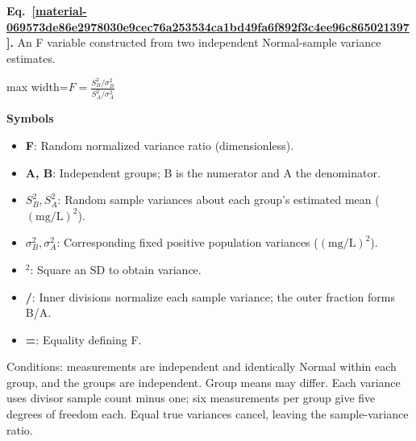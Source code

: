 \documentclass[11pt,a4paper]{article}
\begin{document}
\par\medskip
\noindent\begin{minipage}{\linewidth}
\label{material-069573de86e2978030e9cec76a253534ca1bd49fa6f892f3c4ee96c865021397}
\noindent\textbf{Eq.~\ref*{material-069573de86e2978030e9cec76a253534ca1bd49fa6f892f3c4ee96c865021397}.} An F variable constructed from two independent Normal-sample variance estimates.\par\nopagebreak
\begin{center}\begin{adjustbox}{max width=\linewidth}$\displaystyle F=\frac{S_B^2/\sigma_B^2}{S_A^2/\sigma_A^2}$\end{adjustbox}\end{center}

\par\noindent\textbf{Symbols}

\begin{itemize}\setlength{\itemsep}{1pt}\setlength{\parsep}{0pt}
\item \textbf{F}: Random normalized variance ratio (dimensionless).
\item \textbf{A, B}: Independent groups; B is the numerator and A the denominator.
\item \textbf{\(S_B^2, S_A^2\)}: Random sample variances about each group's estimated mean (\(\mathrm{(mg/L)^2}\)).
\item \textbf{\(σ_B^2, σ_A^2\)}: Corresponding fixed positive population variances (\(\mathrm{(mg/L)^2}\)).
\item \textbf{\ensuremath{{}^2}}: Square an SD to obtain variance.
\item \textbf{/}: Inner divisions normalize each sample variance; the outer fraction forms B/A.
\item \textbf{=}: Equality defining F.
\end{itemize}

Conditions: measurements are independent and identically Normal within each group, and the groups are independent. Group means may differ. Each variance uses divisor sample count minus one; six measurements per group give five degrees of freedom each. Equal true variances cancel, leaving the sample-variance ratio.

\end{minipage}\par
\medskip
\end{document}
